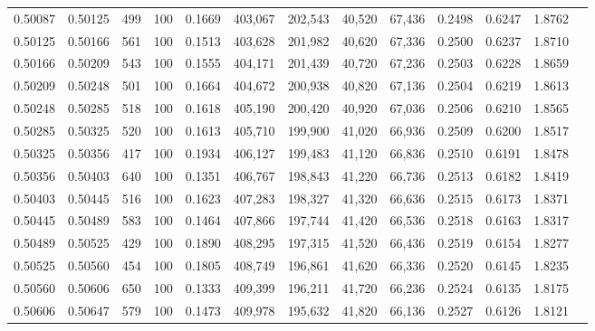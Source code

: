 \begin{tabular}{rrrrrrrrrrrrr}
0.50087 & 0.50125 &   499 & 100 &                                     0.1669 & 403,067 & 202,543 &  40,520 &  67,436 & 0.2498 & 0.6247 & 1.8762 \\
0.50125 & 0.50166 &   561 & 100 &                                     0.1513 & 403,628 & 201,982 &  40,620 &  67,336 & 0.2500 & 0.6237 & 1.8710 \\
0.50166 & 0.50209 &   543 & 100 &                                     0.1555 & 404,171 & 201,439 &  40,720 &  67,236 & 0.2503 & 0.6228 & 1.8659 \\
0.50209 & 0.50248 &   501 & 100 &                                     0.1664 & 404,672 & 200,938 &  40,820 &  67,136 & 0.2504 & 0.6219 & 1.8613 \\
0.50248 & 0.50285 &   518 & 100 &                                     0.1618 & 405,190 & 200,420 &  40,920 &  67,036 & 0.2506 & 0.6210 & 1.8565 \\
0.50285 & 0.50325 &   520 & 100 &                                     0.1613 & 405,710 & 199,900 &  41,020 &  66,936 & 0.2509 & 0.6200 & 1.8517 \\
0.50325 & 0.50356 &   417 & 100 &                                     0.1934 & 406,127 & 199,483 &  41,120 &  66,836 & 0.2510 & 0.6191 & 1.8478 \\
0.50356 & 0.50403 &   640 & 100 &                                     0.1351 & 406,767 & 198,843 &  41,220 &  66,736 & 0.2513 & 0.6182 & 1.8419 \\
0.50403 & 0.50445 &   516 & 100 &                                     0.1623 & 407,283 & 198,327 &  41,320 &  66,636 & 0.2515 & 0.6173 & 1.8371 \\
0.50445 & 0.50489 &   583 & 100 &                                     0.1464 & 407,866 & 197,744 &  41,420 &  66,536 & 0.2518 & 0.6163 & 1.8317 \\
0.50489 & 0.50525 &   429 & 100 &                                     0.1890 & 408,295 & 197,315 &  41,520 &  66,436 & 0.2519 & 0.6154 & 1.8277 \\
0.50525 & 0.50560 &   454 & 100 &                                     0.1805 & 408,749 & 196,861 &  41,620 &  66,336 & 0.2520 & 0.6145 & 1.8235 \\
0.50560 & 0.50606 &   650 & 100 &                                     0.1333 & 409,399 & 196,211 &  41,720 &  66,236 & 0.2524 & 0.6135 & 1.8175 \\
0.50606 & 0.50647 &   579 & 100 &                                     0.1473 & 409,978 & 195,632 &  41,820 &  66,136 & 0.2527 & 0.6126 & 1.8121 \\

\end{tabular}

